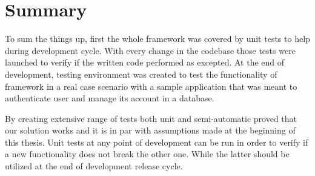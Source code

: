 \section{Summary}
To sum the things up, first the whole framework was covered by unit tests to help during development cycle. With every change in the codebase those tests were launched to verify if the written code performed as excepted. At the end of development, testing environment was created to test the functionality of framework in a real case scenario with a sample application that was meant to authenticate user and manage its account in a database.

By creating extensive range of tests both unit and semi-automatic proved that our solution works and it is in par with assumptions made at the beginning of this thesis. Unit tests at any point of development can be run in order to verify if a new functionality does not break the other one. While the latter should be utilized at the end of development release cycle.
